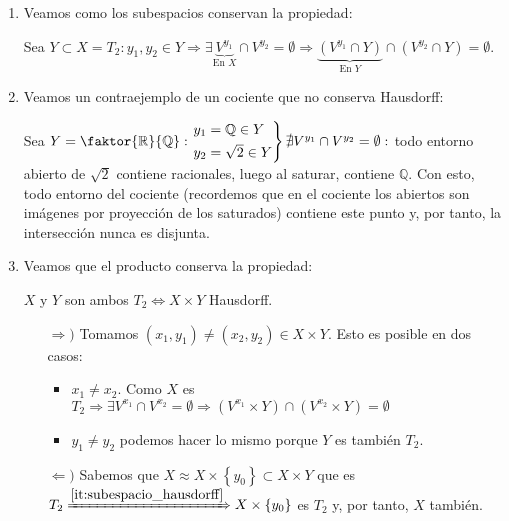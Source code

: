 \begin{demo}
\begin{enumerate}
    \item\label{it:subespacio_hausdorff} Veamos como los subespacios conservan la propiedad: 

    Sea $Y \subset X = T_2: y_1, y_2 \in Y \Rightarrow \exists \underbrace{V^{y_1}}_{\text{En } X}  \cap V^{y_2} = \emptyset \Rightarrow \underbrace{\left( V^{y_1} \cap Y \right)}_{\text{En } Y}  \cap \left( V^{y_2} \cap Y \right) = \emptyset$.

    \item Veamos un contraejemplo de un cociente que no conserva Hausdorff: 

    Sea $Y = \faktor{\mathbb{R}}{\mathbb{Q}}: \begin{rcases}
        y_1 = \mathbb{Q} \in Y\\
        y_2 = \sqrt{2} \in Y
    \end{rcases} \nexists V^{y_1} \cap V^{y_2} = \emptyset: $ todo entorno abierto de $\sqrt{2}$ contiene racionales, luego al saturar, contiene $\mathbb{Q}$. Con esto, todo entorno del cociente (recordemos que en el cociente los abiertos son imágenes por proyección de los saturados) contiene este punto y, por tanto, la intersección nunca es disjunta.

    \item Veamos que el producto conserva la propiedad: 

    $X$ y $Y$ son ambos $T_2 \Leftrightarrow X \times Y$ Hausdorff.
    \begin{itemize}
        \item[$\Rightarrow)$] Tomamos $\left( x_1, y_1 \right) \neq \left( x_2, y_2 \right) \in X \times Y$. Esto es posible en dos casos:
        \begin{itemize}
            \item $x_1 \neq x_2$. Como $X$ es $T_2 \Rightarrow \exists V^{x_1} \cap V^{x_2} = \emptyset \Rightarrow \left( V^{x_1} \times Y \right) \cap \left( V^{x_2} \times Y \right) = \emptyset$ 
            \item $y_1 \neq y_2$ podemos hacer lo mismo porque $Y$ es también $T_2$.
        \end{itemize}

    \item[$\Leftarrow)$] Sabemos que $X \approx X \times \left\{ y_0 \right\} \subset X \times Y$ que es $T_2 \xRightarrow{\ref{it:subespacio_hausdorff}} X \times \left\{ y_0 \right\}$ es $T_2$ y, por tanto, $X$ también.
    \end{itemize} 
    \begin{figure}[H]
        \centering
\end{figure}
\end{enumerate}
\end{demo}
